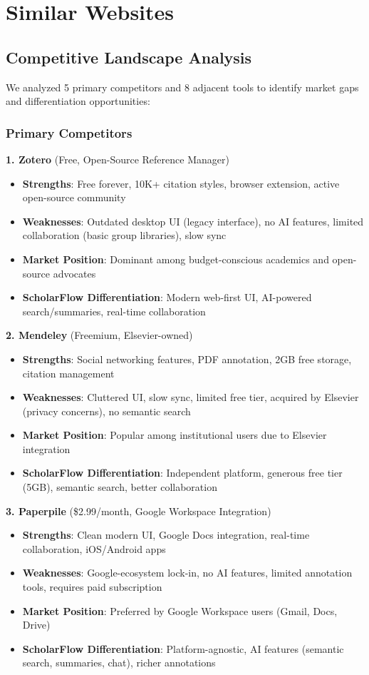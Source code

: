 \section{Similar Websites}

\subsection{Competitive Landscape Analysis}

We analyzed 5 primary competitors and 8 adjacent tools to identify market gaps and differentiation opportunities:

\subsubsection{Primary Competitors}

\textbf{1. Zotero} (Free, Open-Source Reference Manager)
\begin{itemize}
    \item \textbf{Strengths}: Free forever, 10K+ citation styles, browser extension, active open-source community
    \item \textbf{Weaknesses}: Outdated desktop UI (legacy interface), no AI features, limited collaboration (basic group libraries), slow sync
    \item \textbf{Market Position}: Dominant among budget-conscious academics and open-source advocates
    \item \textbf{ScholarFlow Differentiation}: Modern web-first UI, AI-powered search/summaries, real-time collaboration
\end{itemize}

\textbf{2. Mendeley} (Freemium, Elsevier-owned)
\begin{itemize}
    \item \textbf{Strengths}: Social networking features, PDF annotation, 2GB free storage, citation management
    \item \textbf{Weaknesses}: Cluttered UI, slow sync, limited free tier, acquired by Elsevier (privacy concerns), no semantic search
    \item \textbf{Market Position}: Popular among institutional users due to Elsevier integration
    \item \textbf{ScholarFlow Differentiation}: Independent platform, generous free tier (5GB), semantic search, better collaboration
\end{itemize}

\textbf{3. Paperpile} (\$2.99/month, Google Workspace Integration)
\begin{itemize}
    \item \textbf{Strengths}: Clean modern UI, Google Docs integration, real-time collaboration, iOS/Android apps
    \item \textbf{Weaknesses}: Google-ecosystem lock-in, no AI features, limited annotation tools, requires paid subscription
    \item \textbf{Market Position}: Preferred by Google Workspace users (Gmail, Docs, Drive)
    \item \textbf{ScholarFlow Differentiation}: Platform-agnostic, AI features (semantic search, summaries, chat), richer annotations
\end{itemize}

